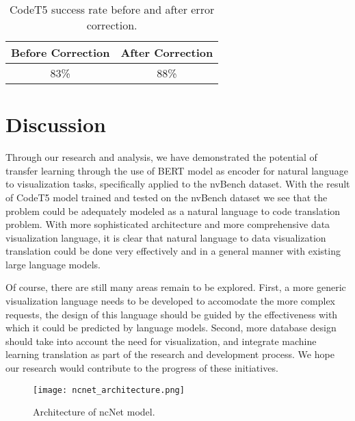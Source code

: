 \documentclass[
	a4paper, %
	10pt, %
	unnumberedsections, %
	twoside, %
]{t0003}
\begin{document}
\begin{table}
	\caption{CodeT5 success rate before and after error correction.}
	\centering
	\begin{tabular}{cc}
		\toprule
		Before Correction & After Correction \\
		\midrule
		83\% & 88\% \\
		\bottomrule
	\end{tabular}
	\label{tab:codet5error}
\end{table}


\section{Discussion}

Through our research and analysis, we have demonstrated the potential of transfer learning through the use of BERT model as encoder for natural language to visualization tasks, specifically applied to the nvBench dataset. With the result of CodeT5 model trained and tested on the nvBench dataset we see that the problem could be adequately modeled as a natural language to code translation problem. With more sophisticated architecture and more comprehensive data visualization language, it is clear that natural language to data visualization translation could be done very effectively and in a general manner with existing large language models.

Of course, there are still many areas remain to be explored. First, a more generic visualization language needs to be developed to accomodate the more complex requests, the design of this language should be guided by the effectiveness with which it could be predicted by language models. Second, more database design should take into account the need for visualization, and integrate machine learning translation as part of the research and development process. We hope our research would contribute to the progress of these initiatives.






\begin{figure*}
	\texttt{[image: ncnet\_architecture.png]}
	\caption{Architecture of ncNet model.}
	\label{fig:ncnet}
\end{figure*}
\end{document}
